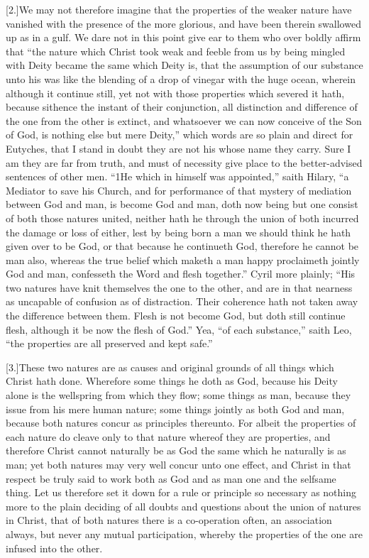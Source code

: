 [2.]We may not therefore imagine that the properties of the weaker nature have vanished with the presence of the more glorious, and have been therein swallowed up as in a gulf. We dare not in this point give ear to them who over boldly affirm that “the nature which Christ took weak and feeble from us by being mingled with Deity became the same which Deity is, that the assumption of our substance unto his was like the blending of a drop of vinegar with the huge ocean, wherein although it continue still, yet not with those properties which severed it hath, because sithence the instant of their conjunction, all distinction and difference of the one from the other is extinct, and whatsoever we can now conceive of the Son of God, is nothing else but mere Deity,” which words are so plain and direct for Eutyches, that I stand in doubt they are not his whose name they carry. Sure I am they are far from truth, and must of necessity give place to  the better-advised sentences of other men.
 “1He which in himself was appointed,” saith Hilary, “a Mediator to save his Church, and for performance of that mystery of mediation between God and man, is become God and man, doth now being but one consist of both those natures united, neither hath he through the union of both incurred the damage or loss of either, lest by being born a man we should think he hath given over to be God, or that because he continueth God, therefore he cannot be man also, whereas the true belief which maketh a man happy proclaimeth jointly God and man, confesseth the Word and flesh together.” Cyril more plainly; “His two natures have knit themselves the one to the other, and are in that nearness as uncapable of confusion as of distraction. Their coherence hath not taken away the difference between them. Flesh is not become God, but doth still continue flesh, although it be now the flesh of God.” Yea, “of each substance,” saith Leo, “the properties are all preserved and kept safe.”

[3.]These two natures are as causes and original grounds of all things which Christ hath done. Wherefore some things he doth as God, because his Deity alone is the wellspring from which they flow; some things as man, because they issue from his mere human nature; some things jointly as both God and man, because both natures concur as principles thereunto. For albeit the properties of each nature do cleave only to that nature whereof they are properties, and therefore Christ cannot naturally be as God the same which he naturally is as man; yet both natures may very well concur unto one effect, and Christ in that respect be truly said to work  both as God and as man one and the selfsame thing.
 Let us therefore set it down for a rule or principle so necessary as nothing more to the plain deciding of all doubts and questions about the union of natures in Christ, that of both natures there is a co-operation often, an association always, but never any mutual participation, whereby the properties of the one are infused into the other.

